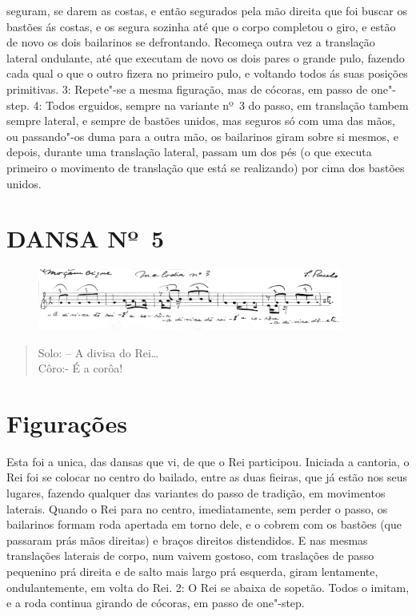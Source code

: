seguram, se darem as costas, e então segurados pela mão direita que foi
buscar os bastões ás costas, e os segura sozinha até que o corpo
completou o giro, e estão de novo os dois bailarinos se defrontando.
Recomeça outra vez a translação lateral ondulante, até que executam de
novo os dois pares o grande pulo, fazendo cada qual o que o outro fizera
no primeiro pulo, e voltando todos ás suas posições primitivas. 3:
Repete"-se a mesma figuração, mas de cócoras, em passo de one"-step. 4:
Todos erguidos, sempre na variante nº~3 do passo, em translação tambem
sempre lateral, e sempre de bastões unidos, mas seguros só com uma das
mãos, ou passando"-os duma para a outra mão, os bailarinos giram sobre si
mesmos, e depois, durante uma translação lateral, passam um dos pés (o
que executa primeiro o movimento de translação que está se realizando)
por cima dos bastões unidos.

\pagebreak

\section{DANSA Nº~5}

\begin{figure}[!ht]
\centering
 \includegraphics[width=100mm]{./imgs/img7.jpg}
\end{figure}

\begin{verse}
Solo: -- A divisa do Rei\ldots{}\\
Côro:- É a corôa!
\end{verse}

\section{Figurações}

Esta foi a unica, das dansas que vi, de que o Rei participou. Iniciada a
cantoria, o Rei foi se colocar no centro do bailado, entre as duas
fieiras, que já estão nos seus lugares, fazendo qualquer das variantes
do passo de tradição, em movimentos laterais. Quando o Rei para no
centro, imediatamente, sem perder o passo, os bailarinos formam roda
apertada em torno dele, e o cobrem com os bastões (que passaram prás
mãos direitas) e braços direitos distendidos. E nas mesmas translações
laterais de corpo, num vaivem gostoso, com traslações de passo pequenino
prá direita e de salto mais largo prá esquerda, giram lentamente,
ondulantemente, em volta do Rei. 2: O Rei se abaixa de sopetão. Todos o
imitam, e a roda continua girando de cócoras, em passo de one"-step.


